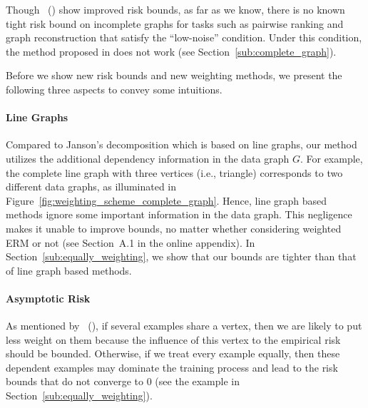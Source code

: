 \documentclass[letterpaper]{article} %
\newcommand{\problemabbr}{\textnormal{C}\textsc{lanet}}
\newcommand{\citet}[1]{\citeauthor{#1}\ (\citeyear{#1})}
\newcommand{\citep}[3]{(#1\ \citeauthor{#3}\ \citeyear{#3},\ #2)}
\begin{document}
Though \citet{wang2017learning} show improved risk bounds, as far as we know, there is no known tight risk bound on incomplete graphs for tasks such as pairwise ranking and graph reconstruction that satisfy the ``low-noise'' condition. Under this condition, the method proposed in \cite{wang2017learning} does not work (see Section~\ref{sub:complete_graph}). 



Before we show new risk bounds and new weighting methods, we present the following three aspects to convey some intuitions. 

\paragraph{Line Graphs} 
Compared to Janson's decomposition which is based on line graphs, our method utilizes the additional dependency information in the data graph $G$. 
For example, the complete line graph with three vertices (i.e., triangle) corresponds to two different data graphs, as illuminated in Figure~\ref{fig:weighting_scheme_complete_graph}. 
Hence, line graph based methods ignore some important information in the data graph. 
This negligence makes it unable to improve bounds, no matter whether considering weighted ERM or not (see Section~A.1 in the online appendix). 
In Section~\ref{sub:equally_weighting}, we show that our bounds are tighter than that of line graph based methods. 

\paragraph{Asymptotic Risk}
As mentioned by \citet{wang2017learning}, if several examples share a vertex, then we are likely to put less weight on them because the influence of this vertex to the empirical risk should be bounded. 
Otherwise, if we treat every example equally, then these dependent examples may dominate the training process and lead to the risk bounds that do not converge to $0$ (see the example in Section~\ref{sub:equally_weighting}).
\end{document}
